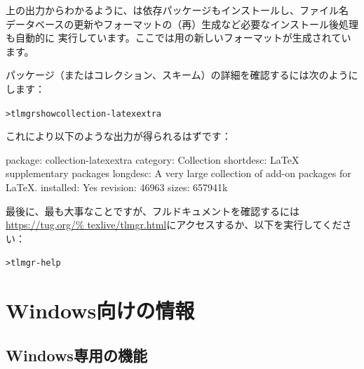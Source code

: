 \documentclass[uplatex,dvipdfmx,12pt,tombow]{jsarticle}
\begin{document}
上の出力からわかるように、は依存パッケージもインストールし、ファイル名
データベースの更新やフォーマットの（再）生成など必要なインストール後処理も自動的に
実行しています。ここでは\XeTeX 用の新しいフォーマットが生成されています。

パッケージ（またはコレクション、スキーム）の詳細を確認するには次のようにします：
%
\begin{alltt}
> tlmgr show collection-latexextra
\end{alltt}
%
これにより以下のような出力が得られるはずです：
%
\begin{fverbatim}
package:    collection-latexextra
category:   Collection
shortdesc:  LaTeX supplementary packages
longdesc:   A very large collection of add-on packages for LaTeX.
installed:  Yes
revision:   46963
sizes:      657941k
\end{fverbatim}
%
最後に、最も大事なことですが、フルドキュメントを確認するには\url{https://tug.org/%
texlive/tlmgr.html}にアクセスするか、以下を実行してください：
%
\begin{alltt}
> tlmgr -help
\end{alltt}

\section{Windows向けの情報}
\label{sec:windows}

\subsection{Windows専用の機能}
\label{sec:winfeatures}
\end{document}
